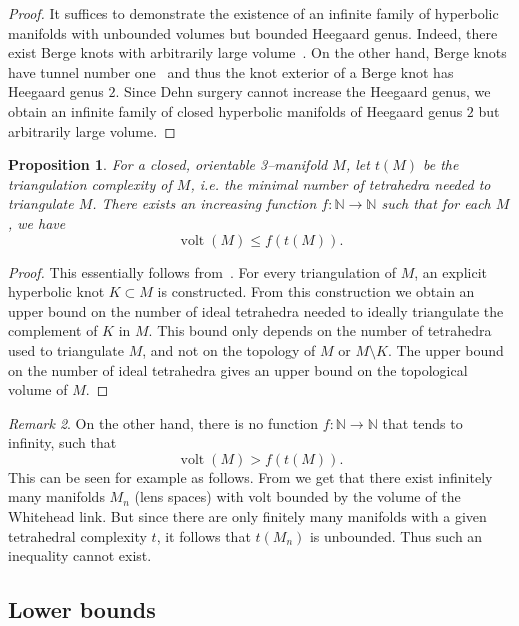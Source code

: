 \documentclass[a4paper]{gtart}
\newtheorem{proposition}{Proposition}[section]
\theoremstyle{definition}
\theoremstyle{remark}
\newtheorem{remark}[proposition]{Remark}
\numberwithin{equation}{section}
\DeclareMathOperator{\volt}{volt}
\begin{document}
\begin{proof}
It suffices to demonstrate the existence of an infinite family of hyperbolic manifolds with unbounded volumes but bounded Heegaard genus. Indeed, there exist Berge knots with arbitrarily large volume~\cite[Theorem~4.1]{Baker_Berge_knots}. On the other hand, Berge knots have tunnel number one~\cite{Berge} and thus the knot exterior of a Berge knot has Heegaard genus $2$. Since Dehn surgery cannot increase the Heegaard genus, we obtain an infinite family of closed hyperbolic manifolds of Heegaard genus $2$ but arbitrarily large volume. 
\end{proof}

\begin{proposition}
    For a closed, orientable 3--manifold $M$, let $t(M)$ be the triangulation complexity of $M$, i.e. the minimal number of tetrahedra needed to triangulate $M$. 
 There exists an increasing function $f\colon \mathbb{N} \to \mathbb{N}$ such that for each $M$, we have
        \begin{equation*}
            \volt(M)\leq f(t(M)).
        \end{equation*}
\end{proposition}

\begin{proof}
This essentially follows from~\cite{My82}. For every triangulation of $M$, an explicit hyperbolic knot $K \subset M$ is constructed. From this construction we obtain an upper bound on the number of ideal tetrahedra needed to ideally triangulate the complement of $K$ in $M$. This bound only depends on the number of tetrahedra used to triangulate $M$, and not on the topology of $M$ or $M \setminus K$. The upper bound on the number of ideal tetrahedra gives an upper bound on the topological volume of $M$.
\end{proof}

\begin{remark}
	On the other hand, there is no function $f\colon \mathbb{N} \to \mathbb{N}$ that tends to infinity, such that 
	$$\volt(M) > f( t(M) ).$$
	This can be seen for example as follows. From  we get that there exist infinitely many manifolds $M_n$ (lens spaces) with volt bounded by the volume of the Whitehead link. But since there are only finitely many manifolds with a given tetrahedral complexity $t$, it follows that $t(M_n)$ is unbounded. Thus such an inequality cannot exist. 
\end{remark}


\subsection{Lower bounds}
\end{document}
